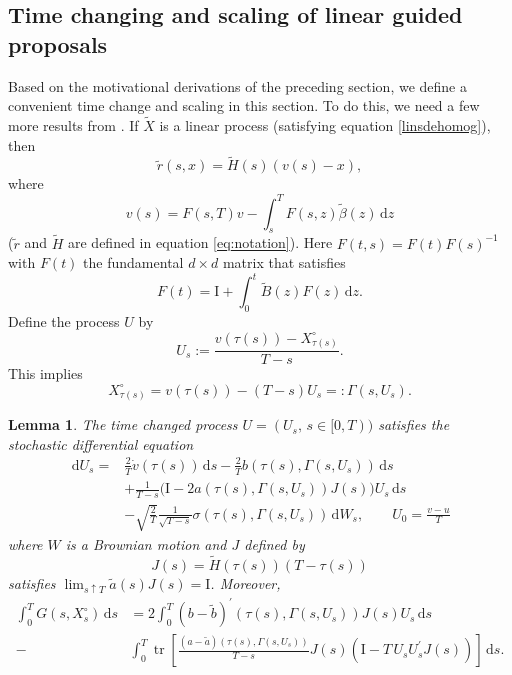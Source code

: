 \documentclass[preprint]{imsart}
\renewcommand{\tilde}{\widetilde}
\providecommand{\I}{\mathrm{I}}
\providecommand{\trace}{{\operatorname{tr}}}
\newtheorem{lemma}[thm]{Lemma}
\theoremstyle{definition}
\newcommand{\dd}{{\,\mathrm d}}
\newcommand{\T}{{\prime}}
\begin{document}
\subsection{Time changing and scaling of linear guided proposals}

Based on the motivational derivations of the preceding section, we define a convenient time change and scaling in this section.  
To do this, we need a few more results from \cite{Schauer}. If $\tilde{X}$ is a linear process (satisfying equation \eqref{linsdehomog}), then
\begin{equation}\label{eq:rel-r-H}
\tilde r(s,x) = \tilde H(s) (v(s)-x),
\end{equation}
where
\begin{equation}\label{def_v}v(s) =  F(s,T) v - \int_s^T F(s,z) \tilde \beta(z) \dd z
\end{equation}
($\tilde r$ and $\tilde H$ are defined in equation \eqref{eq:notation}). 
Here  $F(t,s)=F(t)F(s)^{-1}$ with $F(t)$   the fundamental $d\times d$ matrix that satisfies
\begin{equation}\label{def:F} F(t) = \I + \int_0^t \tilde B(z) F(z) \dd z. \end{equation}
Define the process $U$ by 
\begin{equation}\label{U}
	U_s :=\frac{v(\tau(s))-X^\circ_{\tau(s)}}{T-s}.
\end{equation}
This implies
\begin{equation}\label{eq:Xcirc-back}
 X^\circ_{\tau(s)} = 	 v(\tau(s))- (T-s) U_s=: \Gamma(s, U_s).
\end{equation}




\begin{lemma}\label{lem:tc}
The time changed process $U=(U_s,\, s\in [0,T))$ satisfies the stochastic differential equation
\begin{equation}\label{Usde}
\begin{aligned}
\dd U_s = &  \frac2T\dot v(\tau(s))\dd s  - \frac{2}{T} b(\tau(s), \Gamma(s, U_s)) \dd s  \\&+ \frac{1}{T-s}\Big(\I - 2a(\tau(s), \Gamma(s, U_s))J(s)\Big)  U_s  \dd s \\
& - \sqrt{\frac{2}{T}} \frac1{\sqrt{T - s}} \sigma(\tau(s),\Gamma(s, U_s) ) \dd W_s, \qquad U_0=\frac{v-u}{T}
\end{aligned}
\end{equation}
where $W$ is a Brownian motion and $J$ defined by
\begin{equation}\label{eq:defJ}
J(s) = \tilde H(\tau(s))(T-\tau(s))
\end{equation}
satisfies  $ \lim_{s \uparrow T} \tilde a(s) J(s) = \I$. 
Moreover,
 \begin{align*}\int_0^T G(s,X^\circ_s) \dd s &= 2\int_{ 0}^{ T}  (b - \tilde b)^\T (\tau(s),\Gamma(s, U_s))  J(s) U_s  \dd s \\ - &
  \int_{ 0}^{T} \trace\left[\frac{( a - \tilde a)(\tau(s),\Gamma(s, U_s))}{T-s} J(s)\left(\I-T\, U_s U_s^\T J(s)\right)  \right]\dd s.
\end{align*}
\end{lemma} 
\end{document}
